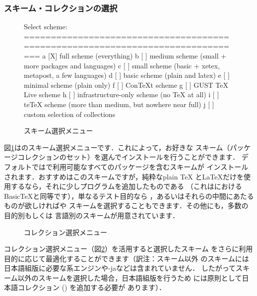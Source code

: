 \documentclass[uplatex,dvipdfmx,tombow]{jsarticle}
\begin{document}
\subsubsection{スキーム・コレクションの選択}
\label{sec:components}

\begin{figure}[tbh]
\begin{boxedverbatim}
Select scheme:
===============================================================================
 a [X] full scheme (everything)
 b [ ] medium scheme (small + more packages and languages)
 c [ ] small scheme (basic + xetex, metapost, a few languages)
 d [ ] basic scheme (plain and latex)
 e [ ] minimal scheme (plain only)
 f [ ] ConTeXt scheme
 g [ ] GUST TeX Live scheme
 h [ ] infrastructure-only scheme (no TeX at all)
 i [ ] teTeX scheme (more than medium, but nowhere near full)
 j [ ] custom selection of collections
\end{boxedverbatim}
\vspace{-1zh}
\caption{スキーム選択メニュー}\label{fig:scheme-text}
\end{figure}

図\ref{fig:scheme-text}は\TL のスキーム選択メニューです．これによって，お好きな
スキーム（パッケージコレクションのセット）を選んでインストールを行うことができます．
デフォルトでは\TL で利用可能なすべてのパッケージを含むスキームが
インストールされます．おすすめはこのスキームですが，純粋なplain \TeX
と\LaTeX だけを使用するなら，それに少しプログラムを追加したものである
（これは\MacTeX におけるBasic\TeX と同等です），単なるテスト目的なら
，あるいはそれらの中間にあたるものが欲しければや
スキームを選択することもできます．その他にも，多数の目的別もしくは
言語別のスキームが用意されています．

\begin{figure}[tb]
\centering {}
\caption{コレクション選択メニュー}\label{fig:collections-gui}
\end{figure}

コレクション選択メニュー（図\ref{fig:collections-gui}）を活用すると選択したスキーム
をさらに利用目的に応じて最適化することができます（訳注：スキーム以外
のスキームには日本語組版に必要な\pTeX 系エンジンや\LuaTeX-jaなどは含まれていません．
したがってスキーム以外のスキームを選択した場合，日本語組版を行うため
には原則として日本語コレクション () を追加する必要が
あります）．
\end{document}
